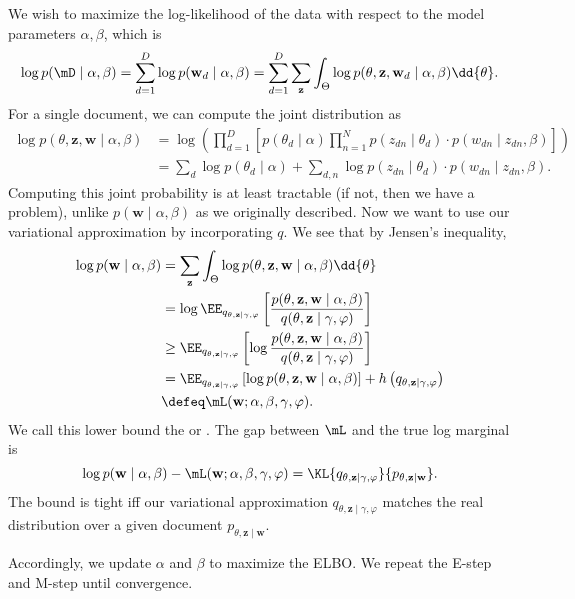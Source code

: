 \begin{enumerate}
    We wish to maximize the log-likelihood of the data with respect to the model parameters $\alpha, \beta$, which is
    \[
    \log p(\mathbf{\mD}\mid \alpha, \beta) = \sum\limits_{d=1}^{D} \log p(\mathbf{w}_d \mid \alpha, \beta) = \sum\limits_{d=1}^{D} \sum\limits_{\mathbf{z}}^{}\int_{\Theta}  \log p(\theta, \mathbf{z}, \mathbf{w}_d\mid \alpha, \beta)\dd{\theta} .
    \]
    For a single document, we can compute the joint distribution as
    \begin{align*}
        \log p(\theta, \mathbf{z}, \mathbf{w}\mid \alpha, \beta) &= \log \left( \prod\limits_{d=1}^{D} \left[ p(\theta_d\mid \alpha) \prod\limits_{n=1}^{N} p(z_{dn}\mid \theta_d) \cdot p(w_{dn}\mid z_{dn}, \beta) \right] \right)
        \\
        &= \sum\limits_{d}^{} \log p(\theta_d\mid \alpha)  + \sum\limits_{d, n}^{} \log p(z_{dn} \mid \theta_d)\cdot p(w_{dn}\mid z_{dn}, \beta).
    \end{align*}
    Computing this joint probability is at least tractable (if not, then we have a problem), unlike $p(\mathbf{w}\mid \alpha, \beta)$ as we originally described. Now we want to use our variational approximation by incorporating $q$.
    We see that by Jensen's inequality,
    \begin{align*}
        \log p(\mathbf{w}\mid \alpha, \beta) 
        &= \sum\limits_{\mathbf{z}}^{} \int_{\Theta} \log p(\theta, \mathbf{z}, \mathbf{w} \mid \alpha, \beta) \dd{\theta}\\
        &= \log \EE_{q_{\theta, \mathbf{z} \mid \gamma, \varphi}}\left[ \frac{p(\theta, \mathbf{z}, \mathbf{w} \mid \alpha, \beta)}{q{(\theta, \mathbf{z} \mid \gamma, \varphi)}}  \right]\\
        &\geq
        \EE_{q_{\theta, \mathbf{z} \mid \gamma, \varphi}}\left[ \log \frac{p(\theta, \mathbf{z}, \mathbf{w} \mid \alpha, \beta)}{q{(\theta, \mathbf{z} \mid \gamma, \varphi)}}  \right]\\
        &= 
        \EE_{q_{\theta, \mathbf{z} \mid \gamma, \varphi}}\left[ \log p(\theta, \mathbf{z}, \mathbf{w} \mid \alpha, \beta) \right] + h\left( q_{\theta, \mathbf{z} \mid \gamma, \varphi} \right)\\
        &\defeq \mL(\mathbf{w}; \alpha, \beta, \gamma, \varphi).
    \end{align*}
    We call this lower bound the  or . The gap between $\mL$ and the true log marginal is
    \[
    \log p(\mathbf{w}\mid \alpha, \beta) - \mL(\mathbf{w}; \alpha, \beta, \gamma, \varphi) = \KL{q_{\theta, \mathbf{z}\mid \gamma, \varphi}}{p_{\theta, \mathbf{z} \mid \mathbf{w}}}.
    \]
    The bound is tight iff our variational approximation $q_{\theta, \mathbf{z} \mid \gamma, \varphi}$ matches the real distribution over a given document $p_{\theta, \mathbf{z} \mid \mathbf{w}}$.

    Accordingly, we update $\alpha$ and $\beta$ to maximize the ELBO.
    \ii We repeat the E-step and M-step until convergence.
\end{enumerate}
